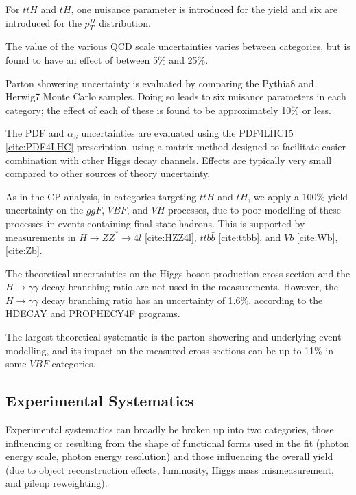 For $ttH$ and $tH$, one nuisance parameter is introduced for the yield and six are introduced for the $p_{T}^{H}$ distribution.

The value of the various QCD scale uncertainties varies between categories, but is found to have an effect of between 5\% and 25\%.

Parton showering uncertainty is evaluated by comparing the Pythia8 and Herwig7 Monte Carlo samples. Doing so leads to six nuisance parameters in each category; the effect of each of these is found to be approximately 10\% or less.

The PDF and $\alpha_{S}$ uncertainties are evaluated using the PDF4LHC15 \ref{cite:PDF4LHC} prescription, using a matrix method designed to facilitate easier combination with other Higgs decay channels. Effects are typically very small compared to other sources of theory uncertainty.

As in the CP analysis, in categories targeting $ttH$ and $tH$, we apply a 100\% yield uncertainty on the $ggF$, $VBF$, and $VH$ processes, due to poor modelling of these processes in events containing final-state hadrons. This is supported by measurements in $H \rightarrow ZZ^{*}\rightarrow 4l$ \ref{cite:HZZ4l}, $t\bar{t}b\bar{b}$ \ref{cite:ttbb}, and $Vb$ \ref{cite:Wb}, \ref{cite:Zb}.

The theoretical uncertainties on the Higgs boson production cross section and the $H \rightarrow \gamma \gamma$ decay branching ratio are not used in the measurements. However, the $H \rightarrow \gamma \gamma$ decay branching ratio has an uncertainty of 1.6\%, according to the HDECAY and PROPHECY4F programs.

The largest theoretical systematic is the parton showering and underlying event modelling, and its impact on the measured cross sections can be up to 11\% in some $VBF$ categories. 

\subsection{Experimental Systematics} \label{subsec:Experimentalsysts}

Experimental systematics can broadly be broken up into two categories, those influencing or resulting from the shape of functional forms used in the fit (photon energy scale, photon energy resolution) and those influencing the overall yield (due to object reconstruction effects, luminosity, Higgs mass mismeasurement, and pileup reweighting).

